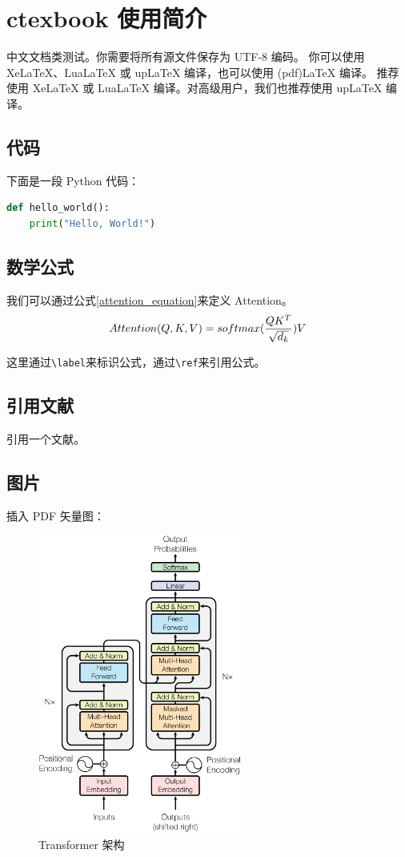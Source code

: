 \chapter{ctexbook 使用简介}
\label{chap:ctexbook}

中文文档类测试。你需要将所有源文件保存为 UTF-8 编码。
你可以使用 XeLaTeX、LuaLaTeX 或 upLaTeX 编译，也可以使用 (pdf)LaTeX 编译。
推荐使用 XeLaTeX 或 LuaLaTeX 编译。对高级用户，我们也推荐使用 upLaTeX 编译。



\section{代码}


下面是一段 Python 代码：
\begin{lstlisting}[language=python, caption={Python 代码示例}]
def hello_world():
    print("Hello, World!")
\end{lstlisting}


\section{数学公式}

我们可以通过公式\ref{attention_equation}来定义 Attention。
\begin{equation}\label{attention_equation}\index{transformer}
    Attention(Q, K, V) = softmax(\frac{QK^T}{\sqrt{d_k}})V
\end{equation}

这里通过\texttt{\textbackslash label}来标识公式，通过\texttt{\textbackslash ref}来引用公式。

\section{引用文献}
引用一个文献\cite{siffer2017anomaly}。


\section{图片}
插入 PDF 矢量图：

\begin{figure}[htbp]
    \includegraphics[width=0.6\textwidth]{./figures/transformer.pdf}
    \centering
    \caption{Transformer 架构\cite{vaswani2017attention}}
\end{figure}
